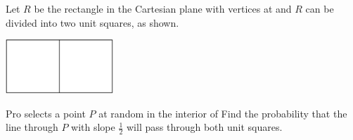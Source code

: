 Let $R$ be the rectangle in the Cartesian plane with vertices at    and  $R$ can be divided into two unit squares, as shown. \begin{center}
\includegraphics[width = 40.400000000000006mm]{img/fig0.png}
\end{center} Pro selects a point $P$ at random in the interior of  Find the probability that the line through $P$ with slope $\frac{1}{2}$ will pass through both unit squares.